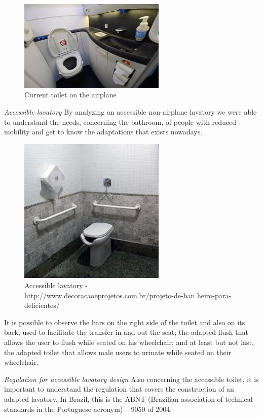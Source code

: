 \begin{figure}[h]
\centering
\includegraphics[width=7cm]{brazil_images/image012.jpg}
\caption{Current toilet on the airplane}%
\label{fig:current_toilet}
\end{figure}

\emph{Accessible lavatory} By analyzing an accessible non-airplane lavatory we were able to understand the needs, concerning the bathroom, of people with reduced mobility and get to know the adaptations that exists nowadays.

\begin{figure}[h]
\centering
\includegraphics[width=7cm]{brazil_images/image013.jpg}
\caption{Accessible lavatory - 
http://www.decoracaoeprojetos.com.br/projeto-de-ban
heiro-para-deficientes/}
\label{fig:accessible_lavatory}
\end{figure}

It is possible to observe the bars on the right side of the toilet and also on its back, used to facilitate the transfer in and out the seat; the adapted flush that allows the user to flush while seated on his wheelchair; and at least but not last, the adapted toilet that allows male users to urinate while seated on their wheelchair.

\emph{Regulation for accessible lavatory design} Also concerning the accessible toilet, it is important to understand the regulation that covers the construction of an adapted lavatory. In Brazil, this is the ABNT (Brazilian association of technical standards in the Portuguese acronym) – 9050 of 2004.

